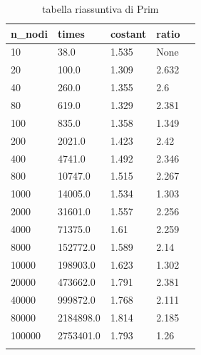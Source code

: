 \renewcommand{\arraystretch}{2}
\begin{longtable}[H]{|p{2cm}|p{2cm}|p{3cm}|p{3cm}|p{3cm}|} 
\hline

    \rowcolor{lightgray}
    \textbf{n\_nodi} & \textbf{times} & \textbf{costant} & \textbf{ratio}\\ \hline\hline  \endhead
    10	&	38.0	&		1.535	&	None \\ \hline
    20	&	100.0	&		1.309	&	2.632 \\ \hline
    40	&	260.0	&		1.355 &		2.6     \\ \hline
    80	&	619.0	&		1.329 &		2.381  \\ \hline
    100	&	835.0	&		1.358 &		1.349 \\ \hline
    200	&	2021.0	&		1.423 &		2.42 \\ \hline
    400	&	4741.0	&		1.492 &		2.346 \\ \hline
    800	&	10747.0	&		1.515 &		2.267 \\ \hline
    1000 &	14005.0	&		1.534 &		1.303 \\ \hline
    2000 &	31601.0	&		1.557 &		2.256 \\ \hline
    4000 &	71375.0	&	    1.61 &		2.259 \\ \hline
    8000 &	152772.0 &		1.589 &		2.14 \\ \hline
    10000 &	198903.0 &		1.623 &		1.302 \\ \hline
    20000 &	473662.0 &		1.791 &		2.381 \\ \hline
    40000 &	999872.0 &		1.768 &		2.111 \\ \hline
    80000 &	2184898.0 &		1.814 &		2.185 \\ \hline
    100000 &	2753401.0 &	1.793 &		1.26 \\ \hline
    \caption{tabella riassuntiva di Prim}
\end{longtable}

